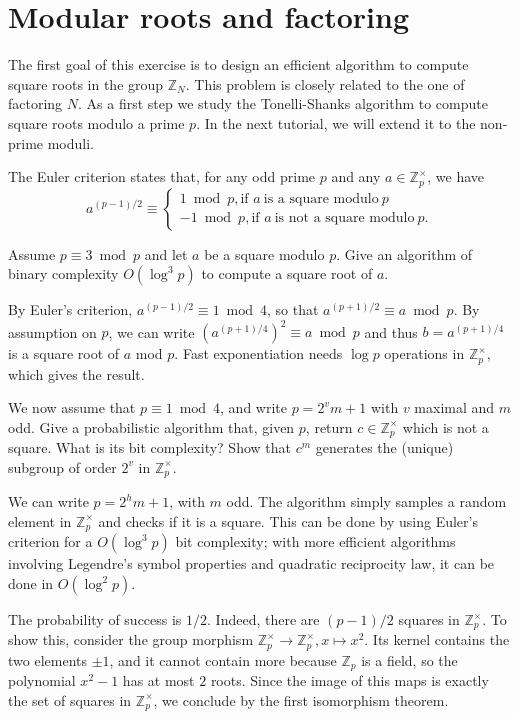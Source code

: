 \documentclass[11pt]{exam}
\theoremstyle{definition}
\begin{document}
{\section{Modular roots and factoring}

The first goal of this exercise is to design an efficient algorithm to compute square roots in the group $\mathbb{Z}_N$. This problem is closely related to the one of factoring $N$. As a first step we study the Tonelli-Shanks algorithm to compute square roots modulo a prime $p$. In the next tutorial, we will extend it to the non-prime moduli.

The Euler criterion states that, for any odd prime $p$ and any $a\in \mathbb{Z}_p^\times$, we have
$$a^{(p-1)/2} \equiv \begin{cases} 1 \bmod p,\text{if~}a~\text{is a square modulo}~p\\
   -1 \bmod p,\text{if~}a~\text{is not a square modulo}~p.\end{cases}$$
  

\begin{questions}
  \question Assume $p\equiv 3 \bmod p$ and let $a$ be a square modulo $p$. Give an algorithm of binary complexity $O(\log^3 p)$ to compute a square root of $a$.
  \begin{solution}
    By Euler's criterion, $a^{(p-1)/2}\equiv 1 \bmod 4$, so that $a^{(p+1)/2} \equiv a\bmod p$. By assumption on $p$, we can write $(a^{(p+1)/4})^2 \equiv a\bmod p$ and thus $b=a^{(p+1)/4}$ is a square root of $a$ mod $p$. Fast exponentiation needs $\log p$ operations in $\mathbb{Z}_p^\times$, which gives the result.
  \end{solution}

  \question We now assume that $p\equiv 1 \bmod 4$, and write $p=2^vm+1$ with $v$ maximal and $m$ odd. Give a probabilistic algorithm that, given $p$, return $c \in \mathbb{Z}_p^\times$ which is not a square. What is its bit complexity? Show that $c^m$ generates the (unique) subgroup of order $2^v$ in $\mathbb Z_p^\times$.
  
  \begin{solution}
    We can write $p=2^hm+1$, with $m$ odd. The algorithm simply samples a random element in $\mathbb{Z}_p^\times$ and checks if it is a square. This can be done by using Euler's criterion for a $O(\log^3 p)$ bit complexity; with more efficient algorithms involving Legendre's symbol properties and quadratic reciprocity law, it can be done in $O(\log^2 p)$.

    The probability of success is $1/2$. Indeed, there are $(p-1)/2$ squares in $\mathbb Z_p^\times$. To show this, consider the group morphism $\mathbb Z_p^\times \rightarrow \mathbb Z_p^\times, x\mapsto x^2$. Its kernel contains the two elements $\pm 1$, and it cannot contain more because $\mathbb{Z}_p$ is a field, so the polynomial $x^2-1$ has at most $2$ roots. Since the image of this maps is exactly the set of squares in $\mathbb Z_p^\times$, we conclude by the first isomorphism theorem.


\end{solution}
\end{questions}}
\end{document}
